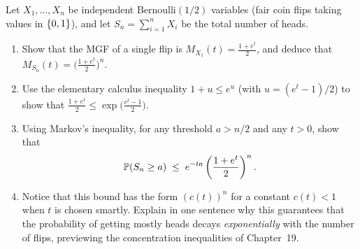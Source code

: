 \begin{exercise}
\label{ch18:ex-chernoff-coin}
Let $X_1,\dots,X_n$ be independent Bernoulli$(1/2)$ variables (fair coin flips
taking values in $\set{0,1}$), and let $S_n = \sum_{i=1}^n X_i$ be the total
number of heads.
\begin{enumerate}[label=(\alph*)]
  \item Show that the MGF of a single flip is $M_{X_1}(t) = \frac{1+e^t}{2}$,
        and deduce that $M_{S_n}(t) = \big(\frac{1+e^t}{2}\big)^n$.
  \item Use the elementary calculus inequality $1+u \le e^u$ (with $u=(e^t-1)/2$)
        to show that $\frac{1+e^t}{2} \le \exp\big(\frac{e^t-1}{2}\big)$.
  \item Using Markov's inequality, for any threshold $a > n/2$ and any $t > 0$,
        show that
        \[
          \P(S_n \ge a) \;\le\; e^{-ta}\left(\frac{1+e^t}{2}\right)^n .
        \]
  \item Notice that this bound has the form $(c(t))^n$ for a constant $c(t) < 1$
        when $t$ is chosen smartly. Explain in one sentence why this guarantees
        that the probability of getting mostly heads decays \emph{exponentially}
        with the number of flips, previewing the concentration inequalities of
        Chapter~19.
\end{enumerate}
\end{exercise}
